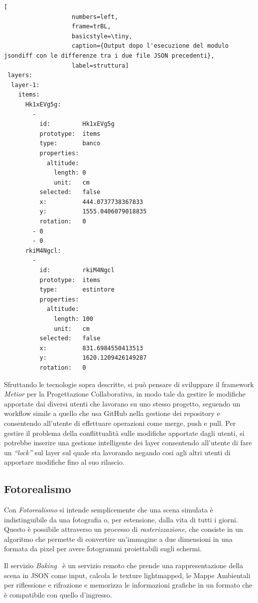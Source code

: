 \begin{lstlisting}[
                   numbers=left,
                   frame=trBL,
                   basicstyle=\tiny,
                   caption={Output dopo l'esecuzione del modulo jsondiff con le differenze tra i due file JSON precedenti},
                   label=struttura]
 layers:
  layer-1:
    items:
      Hk1xEVg5g:
        -
          id:         Hk1xEVg5g
          prototype:  items
          type:       banco
          properties:
            altitude:
              length: 0
              unit:   cm
          selected:   false
          x:          444.0737738367833
          y:          1555.0406079018835
          rotation:   0
        - 0
        - 0
      rkiM4Ngcl:
        -
          id:         rkiM4Ngcl
          prototype:  items
          type:       estintore
          properties:
            altitude:
              length: 100
              unit:   cm
          selected:   false
          x:          831.6984550413513
          y:          1620.1209426149287
          rotation:   0
\end{lstlisting}

Sfruttando le tecnologie sopra descritte, si può pensare di sviluppare il framework \emph{Metior}
per la Progettazione Collaborativa, in modo tale da gestire le modifiche apportate dai diversi utenti che lavorano su uno
stesso progetto, seguendo un workflow simile a quello che usa GitHub nella gestione dei repository e
consentendo all'utente di effettuare operazioni come merge, push e pull.
Per gestire il problema della conflittualità sulle modifiche apportate dagli utenti,
si potrebbe inserire una gestione intelligente dei layer consentendo all'utente di fare un \emph{``lock''} sul layer sul quale
sta lavorando negando cosi agli altri utenti di apportare modifiche fino al suo rilascio.
\newpage

\subsection{Fotorealismo}
\label{sec:conclusions_section_2_sub_3}
Con \emph{Fotorealismo} si intende semplicemente che una scena simulata \`e indistinguibile da una fotografia o, per estensione,
dalla vita di tutti i giorni. Questo è possibile attraverso un processo di \emph{rasterizzazione}, che consiste in un algoritmo che
permette di convertire un'immagine a due dimensioni in una formata da pixel per avere fotogrammi proiettabili sugli schermi.

Il servizio \emph{Baking}~\cite{Spini:2016:WIA:2945292.2945309} \`e un servizio remoto che prende una rappresentazione della scena in JSON come input,
calcola le texture lightmapped, le Mappe Ambientali per riflessione e rifrazione e memorizza le informazioni grafiche
in un formato che \`e compatibile con quello d'ingresso.\\

